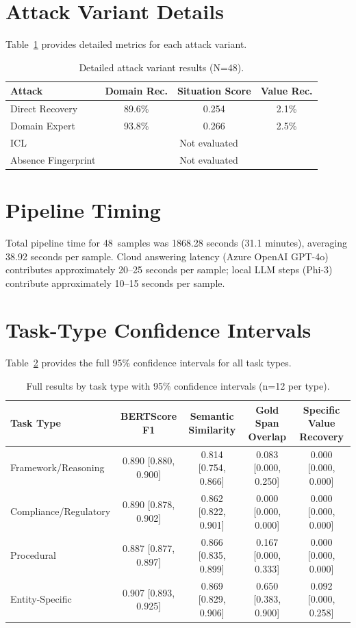 \documentclass[sigconf,anonymous,review,balance=false]{acmart}
\begin{document}
\section{Attack Variant Details}
\label{app:attacks}

Table~\ref{tab:attack-detail} provides detailed metrics for each attack variant.

\begin{table}[h]
\caption{Detailed attack variant results (N=48).}
\label{tab:attack-detail}
\begin{tabular}{lccc}
\toprule
\textbf{Attack} & \textbf{Domain Rec.} & \textbf{Situation Score} & \textbf{Value Rec.} \\
\midrule
Direct Recovery & 89.6\% & 0.254 & 2.1\% \\
Domain Expert & 93.8\% & 0.266 & 2.5\% \\
ICL & \multicolumn{3}{c}{Not evaluated} \\
Absence Fingerprint & \multicolumn{3}{c}{Not evaluated} \\
\bottomrule
\end{tabular}
\end{table}

\section{Pipeline Timing}
\label{app:timing}

Total pipeline time for 48~samples was 1868.28 seconds (31.1 minutes), averaging 38.92 seconds per sample. Cloud answering latency (Azure OpenAI GPT-4o) contributes approximately 20--25 seconds per sample; local LLM steps (Phi-3) contribute approximately 10--15 seconds per sample.

\section{Task-Type Confidence Intervals}
\label{app:ci}

Table~\ref{tab:ci} provides the full 95\% confidence intervals for all task types.

\begin{table}[h]
\caption{Full results by task type with 95\% confidence intervals (n=12 per type).}
\label{tab:ci}
\begin{tabular}{lcccc}
\toprule
\textbf{Task Type} & \textbf{BERTScore F1} & \textbf{Semantic Similarity} & \textbf{Gold Span Overlap} & \textbf{Specific Value Recovery} \\
\midrule
Framework/Reasoning & 0.890 [0.880, 0.900] & 0.814 [0.754, 0.866] & 0.083 [0.000, 0.250] & 0.000 [0.000, 0.000] \\
Compliance/Regulatory & 0.890 [0.878, 0.902] & 0.862 [0.822, 0.901] & 0.000 [0.000, 0.000] & 0.000 [0.000, 0.000] \\
Procedural & 0.887 [0.877, 0.897] & 0.866 [0.835, 0.899] & 0.167 [0.000, 0.333] & 0.000 [0.000, 0.000] \\
Entity-Specific & 0.907 [0.893, 0.925] & 0.869 [0.829, 0.906] & 0.650 [0.383, 0.900] & 0.092 [0.000, 0.258] \\
\bottomrule
\end{tabular}
\end{table}
\end{document}

